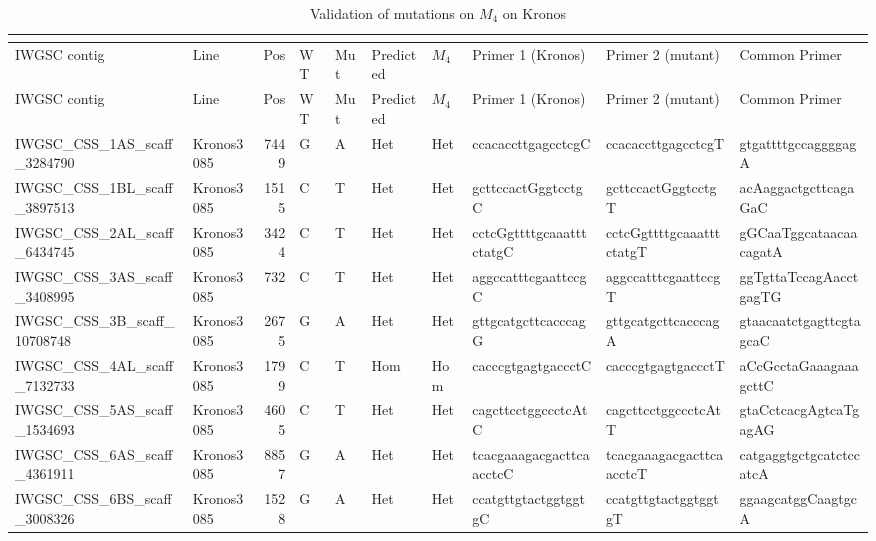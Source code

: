 
\begin{longtable}{llrlllllll}
\caption{Validation of mutations on $M_{4}$ on Kronos}\\
\label{app:PolyMarkerM4ValidationKronos}\\
\toprule
 IWGSC contig                 & Line       &   Pos & WT   & Mut   & Predicted   & $M_{4}$      & Primer 1 (Kronos)        & Primer 2 (mutant)         & Common Primer             \\
\midrule
\endfirsthead
\toprule
 IWGSC contig                 & Line       &   Pos & WT   & Mut   & Predicted   & $M_{4}$      & Primer 1 (Kronos)        & Primer 2 (mutant)         & Common Primer             \\
\midrule
\endhead
\bottomrule
\endfoot
\bottomrule
\endlastfoot
 IWGSC\_CSS\_1AS\_scaff\_3284790  & Kronos3085 &  7449 & G    & A     & Het    & Het   & ccacaccttgagcctcgC       & ccacaccttgagcctcgT       & gtgattttgccaggggagA      \\
 IWGSC\_CSS\_1BL\_scaff\_3897513  & Kronos3085 &  1515 & C    & T     & Het    & Het   & gcttccactGggtcctgC       & gcttccactGggtcctgT       & acAaggactgcttcagaGaC     \\
 IWGSC\_CSS\_2AL\_scaff\_6434745  & Kronos3085 &  3424 & C    & T     & Het    & Het   & cctcGgttttgcaaatttctatgC & cctcGgttttgcaaatttctatgT & gGCaaTggcataacaacagatA   \\
 IWGSC\_CSS\_3AS\_scaff\_3408995  & Kronos3085 &   732 & C    & T     & Het    & Het   & aggccatttcgaattccgC      & aggccatttcgaattccgT      & ggTgttaTccagAacctgagTG   \\
 IWGSC\_CSS\_3B\_scaff\_10708748  & Kronos3085 &  2675 & G    & A     & Het    & Het   & gttgcatgcttcacccagG      & gttgcatgcttcacccagA      & gtaacaatctgagttcgtagcaC  \\
 IWGSC\_CSS\_4AL\_scaff\_7132733  & Kronos3085 &  1799 & C    & T     & Hom    & Hom   & cacccgtgagtgaccctC       & cacccgtgagtgaccctT       & aCcGcctaGaaagaaagcttC    \\
 IWGSC\_CSS\_5AS\_scaff\_1534693  & Kronos3085 &  4605 & C    & T     & Het    & Het   & cagcttcctggccctcAtC      & cagcttcctggccctcAtT      & gtaCctcacgAgtcaTgagAG    \\
 IWGSC\_CSS\_6AS\_scaff\_4361911  & Kronos3085 &  8857 & G    & A     & Het    & Het   & tcacgaaagacgacttcaacctcC & tcacgaaagacgacttcaacctcT & catgaggtgctgcatctccatcA  \\
 IWGSC\_CSS\_6BS\_scaff\_3008326  & Kronos3085 &  1528 & G    & A     & Het    & Het   & ccatgttgtactggtggtgC     & ccatgttgtactggtggtgT     & ggaagcatggCaagtgcA       \\

\end{longtable}

